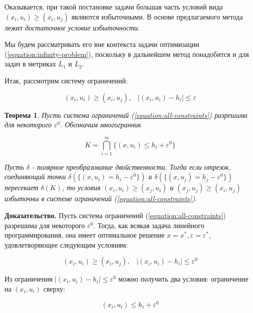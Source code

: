 \documentclass[a4paper, 10pt]{article}
\theoremstyle{definition}
\theoremstyle{plain}
\newtheorem{SmartTheorem}{Теорема}
\theoremstyle{plain}
\begin{document}
Оказывается, при такой постановке задачи большая часть условий вида
$(x_{i}, u_{i}) \geq (x_{i}, u_{j})$ являются избыточными.
В основе предлагаемого метода лежит \textit{достаточное условие избыточности}.

Мы будем рассматривать его вне контекста задачи оптимизации
(\ref{equation:infinity-problem}), поскольку в дальнейшем метод понадобится и
для задач в метриках $L_{1}$ и $L_{2}$.

Итак, рассмотрим систему ограничений:

\begin{equation}
\label{equation:all-constraints}
 (x_{i}, u_{i}) \geq (x_{i}, u_{j}), \;\;\;
 |(x_{i}, u_{i}) - h_{i}| \leq \varepsilon
\end{equation}

\begin{SmartTheorem}\label{theorem:exhaustive-conditions}
Пусть система ограничений (\ref{equation:all-constraints}) разрешима
для некоторого $\varepsilon^{0}$. Обозначим многогранник

\begin{equation}
\label{equation:upper-bounds-polyhedron}
 K = \bigcap \limits_{i = 1}^{m}\{(x, u_{i}) \leq h_{i} + \varepsilon^{0}\}
\end{equation}

Пусть $\delta$ - полярное преобразование двойственности.
Тогда если отрезок, соединяющий точки
$\delta(\{(x, u_{i}) = h_{i} - \varepsilon^{0}\})$ и
$\delta(\{(x, u_{j}) = h_{j} - \varepsilon^{0}\})$ пересекает
$\delta(K)$, то условия $(x_{i}, u_{i}) \geq (x_{j}, u_{i})$ и
$(x_{j}, u_{j}) \geq (x_{i}, u_{j})$ избыточны в системе ограничений
(\ref{equation:all-constraints}).
\end{SmartTheorem}

\textbf{Доказательство.}
Пусть система ограничений (\ref{equation:all-constraints}) разрешима
для некоторого $\varepsilon^{0}$. Тогда, как всякая задача линейного
программирования, она имеет оптимальное решение
$x = x^{*}, \varepsilon = \varepsilon^{*}$, удовлетворяющее следующим условиям:

\begin{equation}
 (x_{i}, u_{i}) \geq (x_{i}, u_{j}), \;\;\;
 |(x_{i}, u_{i}) - h_{i}| \leq \varepsilon^{0}
\end{equation}

Из ограничения  $|(x_{i}, u_{i}) - h_{i}| \leq \varepsilon^{0}$ можно
получить два условия: ограничение на $(x_{i}, u_{i})$ сверху:

\begin{equation}
 (x_{i}, u_{i}) \leq h_{i} + \varepsilon^{0}
\end{equation}
\end{document}
